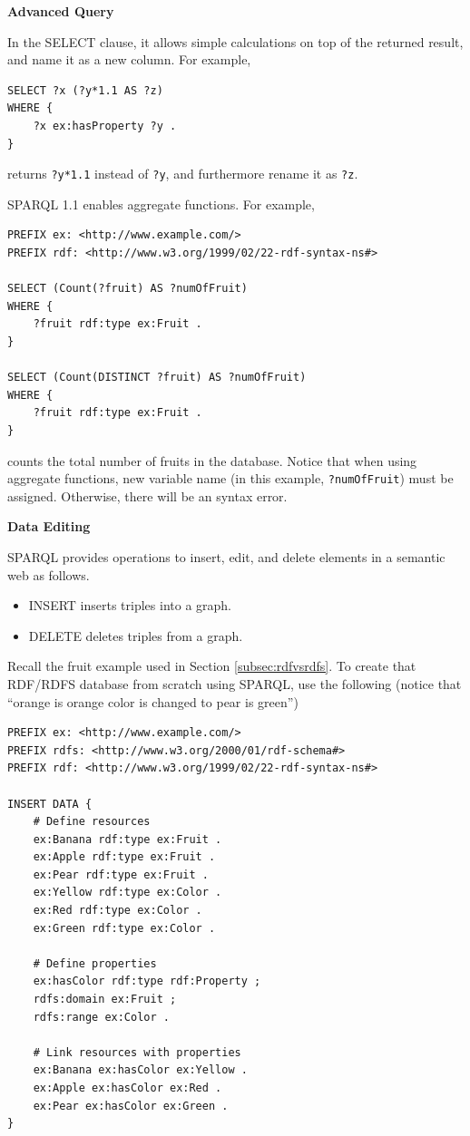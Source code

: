 \vspace{0.1in}
\noindent \textbf{Advanced Query}
\vspace{0.1in}

In the SELECT clause, it allows simple calculations on top of the returned result, and name it as a new column. For example,
\begin{lstlisting}
SELECT ?x (?y*1.1 AS ?z)
WHERE {
	?x ex:hasProperty ?y .
}
\end{lstlisting}
returns \verb|?y*1.1| instead of \verb|?y|, and furthermore rename it as \verb|?z|.

SPARQL 1.1 enables aggregate functions. For example,
\begin{lstlisting}
PREFIX ex: <http://www.example.com/>
PREFIX rdf: <http://www.w3.org/1999/02/22-rdf-syntax-ns#>

SELECT (Count(?fruit) AS ?numOfFruit)
WHERE {
	?fruit rdf:type ex:Fruit .
}

SELECT (Count(DISTINCT ?fruit) AS ?numOfFruit)
WHERE {
	?fruit rdf:type ex:Fruit .
}
\end{lstlisting}
counts the total number of fruits in the database. Notice that when using aggregate functions, new variable name (in this example, \verb|?numOfFruit|) must be assigned. Otherwise, there will be an syntax error.

\vspace{0.1in}
\noindent \textbf{Data Editing}
\vspace{0.1in}

SPARQL provides operations to insert, edit, and delete elements in a semantic web as follows.
\begin{itemize}
	\item INSERT inserts triples into a graph.
	\item DELETE deletes triples from a graph.
\end{itemize}

Recall the fruit example used in Section \ref{subsec:rdfvsrdfs}. To create that RDF/RDFS database from scratch using SPARQL, use the following (notice that ``orange is orange color is changed to pear is green'')
\begin{lstlisting}
PREFIX ex: <http://www.example.com/>
PREFIX rdfs: <http://www.w3.org/2000/01/rdf-schema#>
PREFIX rdf: <http://www.w3.org/1999/02/22-rdf-syntax-ns#>

INSERT DATA {
	# Define resources
	ex:Banana rdf:type ex:Fruit .
	ex:Apple rdf:type ex:Fruit .
	ex:Pear rdf:type ex:Fruit .
	ex:Yellow rdf:type ex:Color .
	ex:Red rdf:type ex:Color .
	ex:Green rdf:type ex:Color .
	
	# Define properties
	ex:hasColor rdf:type rdf:Property ;
	rdfs:domain ex:Fruit ;
	rdfs:range ex:Color .
	
	# Link resources with properties
	ex:Banana ex:hasColor ex:Yellow .
	ex:Apple ex:hasColor ex:Red .
	ex:Pear ex:hasColor ex:Green .
}
\end{lstlisting}

